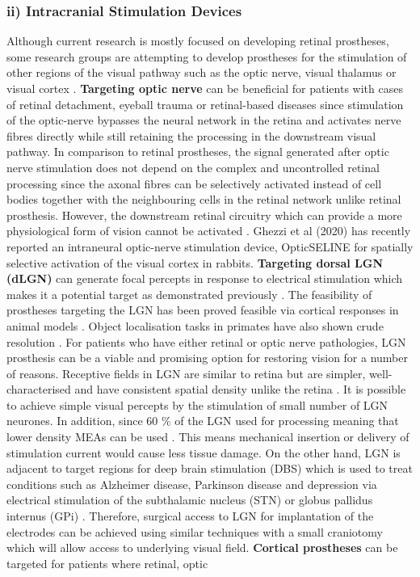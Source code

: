 \subsubsection{ii) Intracranial Stimulation Devices}
Although current research is mostly focused on developing retinal prostheses, some research groups are attempting to develop prostheses for the stimulation of other regions of the visual pathway such as the optic nerve, visual thalamus or visual cortex \cite{gaillet2020spatially}. \textbf{Targeting optic nerve} can be beneficial for patients with cases of retinal detachment, eyeball trauma or retinal-based diseases since stimulation of the optic-nerve bypasses the neural network in the retina and activates nerve fibres directly while still retaining the processing in the downstream visual pathway. In comparison to retinal prostheses, the signal generated after optic nerve stimulation does not depend on the complex and uncontrolled retinal processing since the axonal fibres can be selectively activated instead of cell bodies together with the neighbouring cells in the retinal network unlike retinal prosthesis. However, the downstream retinal circuitry which can provide a more physiological form of vision cannot be activated \cite{gaillet2020spatially}. Ghezzi et al (2020) has recently reported an intraneural optic-nerve stimulation device, OpticSELINE for spatially selective activation of the visual cortex in rabbits. \cite{gaillet2020spatially} \textbf{Targeting dorsal LGN (dLGN)} can generate focal percepts in response to electrical stimulation which makes it a potential target as demonstrated previously \cite{pezaris2005microstimulation}. The feasibility of prostheses targeting the LGN has been proved feasible via cortical responses in animal models \cite{panetsos2011consistent}. Object localisation tasks in primates have also shown crude resolution \cite{pezaris2007demonstration}. For patients who have either retinal or optic nerve pathologies, LGN prosthesis can be a viable and promising option for restoring vision for a number of reasons. Receptive fields in LGN are similar to retina but are simpler, well-characterised and have consistent spatial density unlike the retina \cite{pezaris2005microstimulation} \cite{pezaris2007demonstration}. It is possible to achieve simple visual percepts by the stimulation of small number of LGN neurones. In addition, since 60 $\%$ of the LGN used for processing meaning that lower density MEAs can be used \cite{pezaris2005microstimulation} \cite{pezaris2007demonstration}. This means mechanical insertion or delivery of stimulation current would cause less tissue damage. \cite{pezaris2005microstimulation} On the other hand, LGN is adjacent to target regions for deep brain stimulation (DBS) which is used to treat conditions such as Alzheimer disease, Parkinson disease and depression via electrical stimulation of the subthalamic nucleus (STN) or globus pallidus internus (GPi) \cite{lozano2019deep}. Therefore, surgical access to LGN for implantation of the electrodes can be achieved using similar techniques with a small craniotomy which will allow access to underlying visual field. \cite{pezaris2009getting} \textbf{Cortical prostheses} can be targeted for patients where retinal, optic 